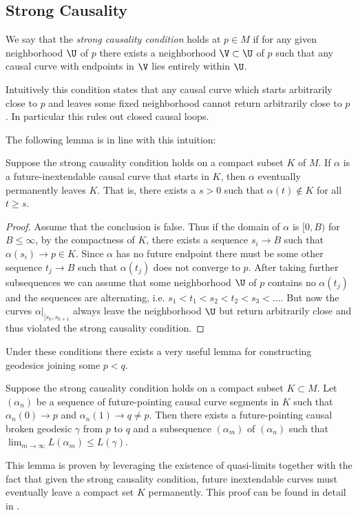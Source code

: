 \subsection{Strong Causality}

\begin{definition}\label{def:scc}
We say that the \emph{strong causality condition} holds at $p\in M$ if for any given neighborhood $\U$ of $p$ there exists a neighborhood $\V \subset \U$ of $p$ such that any causal curve with endpoints in $\V$ lies entirely within $\U$.
\end{definition}
Intuitively this condition states that any causal curve which starts arbitrarily close to $p$ and leaves some fixed neighborhood cannot return arbitrarily close to $p$. In particular this rules out closed causal loops.

The following lemma is in line with this intuition:
\begin{lemma}\label{lem:leavescompact}
Suppose the strong causality condition holds on a compact subset $K$ of $M$. If $\alpha$ is a future-inextendable causal curve that starts in $K$, then $\alpha$ eventually permanently leaves $K$. That is, there exists a $s>0$ such that $\alpha(t)\notin K$ for all $t\geq s$.
\end{lemma}
\begin{proof}
Assume that the conclusion is false. Thus if the domain of $\alpha$ is $[0,B)$ for $B\leq \infty$, by the compactness of $K$, there exists a sequence $s_i\to B$ such that $\alpha(s_i)\to p\in K$. Since $\alpha$ has no future endpoint there must be some other sequence $t_j\to B$ such that $\alpha(t_j)$ does not converge to $p$. After taking further subsequences we can assume that some neighborhood $\U$ of $p$ contains no $\alpha(t_j)$ and the sequences are alternating, i.e. $s_1<t_1<s_2<t_2<s_3<\dots$. But now the curves $\alpha\rvert_{[s_k,s_{k+1}}$ always leave the neighborhood $\U$ but return arbitrarily close and thus violated the strong causality condition.
\end{proof}

Under these conditions there exists a very useful lemma for constructing geodesics joining some $p<q$.
\begin{lemma}\label{lem:geodconstr}
Suppose the strong causality condition holds on a compact subset $K\subset M$. Let $(\alpha_n)$ be a sequence of future-pointing causal curve segments in $K$ such that $\alpha_n(0) \to p$ and $\alpha_n(1)\to q\neq p$. Then there exists a future-pointing causal broken geodesic $\gamma$ from $p$ to $q$ and a subsequence $(\alpha_m)$ of $(\alpha_n)$ such that $\lim_{m\to\infty} L(\alpha_m) \leq L(\gamma)$.
\end{lemma}
This lemma is proven by leveraging the existence of quasi-limits together with the fact that given the strong causality condition, future inextendable curves must eventually leave a compact set $K$ permanently. This proof can be found in detail in \cite[Lemma 14.14]{oneill}.

